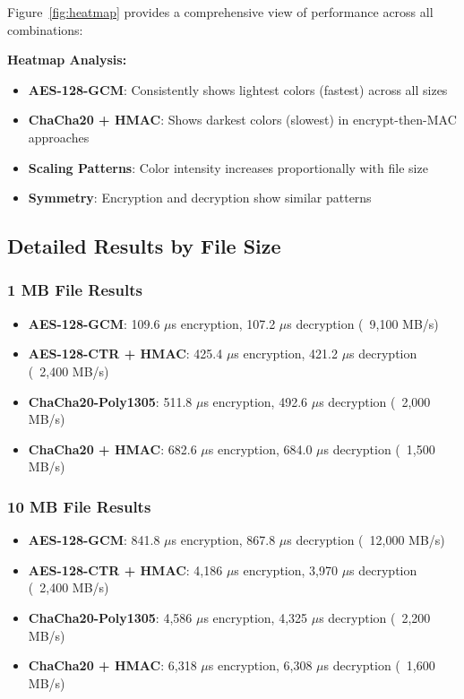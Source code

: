 \documentclass[12pt,a4paper]{article}
\begin{document}
Figure~\ref{fig:heatmap} provides a comprehensive view of performance across all combinations:

\textbf{Heatmap Analysis:}
\begin{itemize}
    \item \textbf{AES-128-GCM}: Consistently shows lightest colors (fastest) across all sizes
    \item \textbf{ChaCha20 + HMAC}: Shows darkest colors (slowest) in encrypt-then-MAC approaches
    \item \textbf{Scaling Patterns}: Color intensity increases proportionally with file size
    \item \textbf{Symmetry}: Encryption and decryption show similar patterns
\end{itemize}

\subsection{Detailed Results by File Size}

\subsubsection{1 MB File Results}
\begin{itemize}
    \item \textbf{AES-128-GCM}: 109.6 $\mu$s encryption, 107.2 $\mu$s decryption (~9,100 MB/s)
    \item \textbf{AES-128-CTR + HMAC}: 425.4 $\mu$s encryption, 421.2 $\mu$s decryption (~2,400 MB/s)
    \item \textbf{ChaCha20-Poly1305}: 511.8 $\mu$s encryption, 492.6 $\mu$s decryption (~2,000 MB/s)
    \item \textbf{ChaCha20 + HMAC}: 682.6 $\mu$s encryption, 684.0 $\mu$s decryption (~1,500 MB/s)
\end{itemize}

\subsubsection{10 MB File Results}
\begin{itemize}
    \item \textbf{AES-128-GCM}: 841.8 $\mu$s encryption, 867.8 $\mu$s decryption (~12,000 MB/s)
    \item \textbf{AES-128-CTR + HMAC}: 4,186 $\mu$s encryption, 3,970 $\mu$s decryption (~2,400 MB/s)
    \item \textbf{ChaCha20-Poly1305}: 4,586 $\mu$s encryption, 4,325 $\mu$s decryption (~2,200 MB/s)
    \item \textbf{ChaCha20 + HMAC}: 6,318 $\mu$s encryption, 6,308 $\mu$s decryption (~1,600 MB/s)
\end{itemize}
\end{document}
